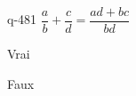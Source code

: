 \begin{truefalse}{q-481}
$\dfrac{a}{b}+ \dfrac{c}{d} =\dfrac{ad+bc}{bd}$
\item* Vrai
\item Faux
\end{truefalse}

